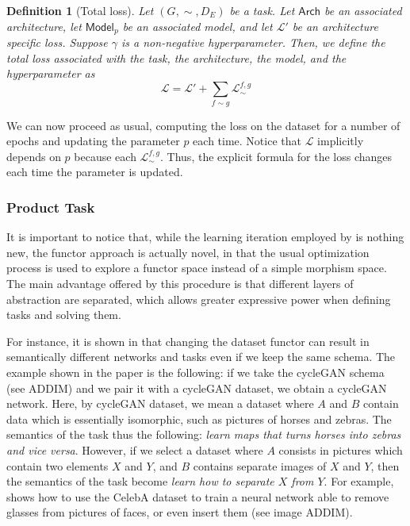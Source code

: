 \documentclass[11pt,a4paper,openright,twoside]{report}
\theoremstyle{plain}
\newtheorem{definition}[proposition]{Definition}
\theoremstyle{definition}
\begin{document}
\begin{definition}[Total loss]
  Let $(G,{\sim},D_E)$ be a task. Let $\mathsf{Arch}$ be an associated architecture, let $\mathsf{Model}_p$ be an associated model, and let $\mathcal{L}'$ be an architecture specific loss. Suppose $\gamma$ is a non-negative hyperparameter. Then, we define the total loss associated with the task, the architecture, the model, and the hyperparameter as
  \begin{equation}
    \label{eq: sumoflosses}
    \mathcal{L} = \mathcal{L}' + \sum_{f \sim g}\mathcal{L}_{\sim}^{f,g}
  \end{equation}
\end{definition}

We can now proceed as usual, computing the loss on the dataset for a number of epochs and updating the parameter $p$ each time. Notice that $\mathcal{L}$ implicitly depends on $p$ because each $\mathcal{L}_{\sim}^{f,g}$. Thus, the explicit formula for the loss changes each time the parameter is updated.


\subsubsection{Product Task}


It is important to notice that, while the learning iteration employed by \cite{gavranovicLearningFunctorsUsing2020} is nothing new, the functor approach is actually novel, in that the usual optimization process is used to explore a functor space instead of a simple morphism space. The main advantage offered by this procedure is that different layers of abstraction are separated, which allows greater expressive power when defining tasks and solving them. 


For instance, it is shown in \cite{gavranovicLearningFunctorsUsing2020} that changing the dataset functor can result in semantically different networks and tasks even if we keep the same schema. The example shown in the paper is the following: if we take the cycleGAN schema (see ADDIM) and we pair it with a cycleGAN dataset, we obtain a cycleGAN network. Here, by cycleGAN dataset, we mean a dataset where $A$ and $B$ contain data which is essentially isomorphic, such as pictures of horses and zebras. The semantics of the task thus the following: \textit{learn maps that turns horses into zebras and vice versa}. However, if we select a dataset where $A$ consists in pictures which contain two elements $X$ and $Y$, and $B$ contains separate images of $X$ and $Y$, then the semantics of the task become \textit{learn how to separate $X$ from $Y$}. For example, \cite{gavranovicLearningFunctorsUsing2020} shows how to use the CelebA dataset to train a neural network able to remove glasses from pictures of faces, or even insert them (see image ADDIM).
\end{document}
